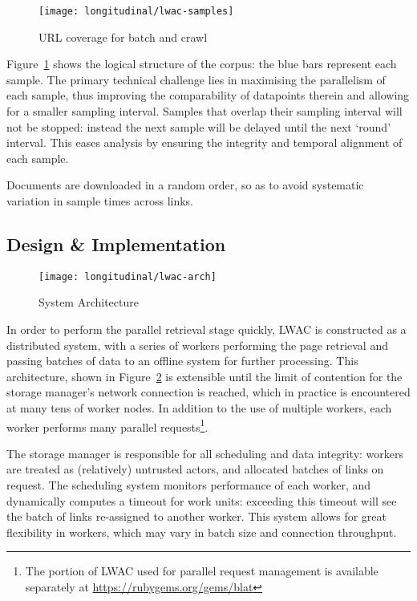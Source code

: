 \begin{figure}[ht]
    \centering
    \texttt{[image: longitudinal/lwac-samples]}
    \caption{URL coverage for batch and crawl}
    \label{fig:longitudinal:lwac:samples}
\end{figure}


Figure~\ref{fig:longitudinal:lwac:samples} shows the logical structure of the corpus: the blue bars represent each sample.  The primary technical challenge lies in maximising the parallelism of each sample, thus improving the comparability of datapoints therein and allowing for a smaller sampling interval.  Samples that overlap their sampling interval will not be stopped: instead the next sample will be delayed until the next `round' interval.  This eases analysis by ensuring the integrity and temporal alignment of each sample.

Documents are downloaded in a random order, so as to avoid systematic variation in sample times across links.



\subsection{Design \& Implementation}


\begin{figure}[ht]
    \centering
    \texttt{[image: longitudinal/lwac-arch]}
    \caption{System Architecture}
    \label{fig:longitudinal:lwac:arch}
\end{figure}


In order to perform the parallel retrieval stage quickly, LWAC is constructed as a distributed system, with a series of workers performing the page retrieval and passing batches of data to an offline system for further processing.  This architecture, shown in Figure~\ref{fig:longitudinal:lwac:arch} is extensible until the limit of contention for the storage manager's network connection is reached, which in practice is encountered at many tens of worker nodes.  In addition to the use of multiple workers, each worker performs many parallel requests\footnote{The portion of LWAC used for parallel request management is available separately at \url{https://rubygems.org/gems/blat}}.

The storage manager is responsible for all scheduling and data integrity: workers are treated as (relatively) untrusted actors, and allocated batches of links on request.  The scheduling system monitors performance of each worker, and dynamically computes a timeout for work units: exceeding this timeout will see the batch of links re-assigned to another worker.  This system allows for great flexibility in workers, which may vary in batch size and connection throughput.

